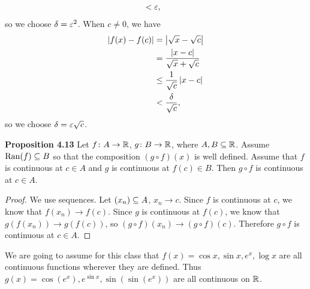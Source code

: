 \documentclass[class=article, crop=false]{standalone}
\begin{document}
\begin{example}{}
\begin{enumerate}[label=\arabic*)]
\begin{align*}
                          &< \varepsilon,
      \end{align*}
      so we choose $\delta = \varepsilon^2$. When $c\neq 0$, we have
      \begin{align*}
        \left\lvert f(x) - f(c) \right\rvert &= \left\lvert \sqrt{x} - \sqrt{c} \right\rvert \\
                          &= \frac{\left\lvert x - c \right\rvert}{\sqrt{x} + \sqrt{c}} \\
                          &\leq \frac{1}{\sqrt{c}}\left\lvert x - c \right\rvert \\
                          &< \frac{\delta}{\sqrt{c}},
      \end{align*}
      so we choose $\delta = \varepsilon\sqrt{c}$.
    \end{enumerate}
  \end{example}
  \newpage
  \textbf{Proposition 4.13} Let $f\colon A\to \mathbb{R}$, $g\colon B\to \mathbb{R}$, where $A, B\subseteq \mathbb{R}$. Assume $\operatorname{Ran}(f)\subseteq B$ so that the composition $(g\circ f)(x)$ is well defined. Assume that $f$ is continuous at $c\in A$ and $g$ is continuous at $f(c)\in B$. Then $g\circ f$ is continuous at $c\in A$.
  \begin{proof}
    We use sequences. Let $(x_n)\subseteq A$, $x_n\to c$. Since $f$ is continuous at $c$, we know that $f(x_n)\to f(c)$. Since $g$ is continuous at $f(c)$, we know that $g(f(x_n))\to g(f(c))$, so $(g\circ f)(x_n)\to (g\circ f)(c)$. Therefore $g\circ f$ is continuous at $c\in A$.
  \end{proof}
  \begin{example}{}
    We are going to assume for this class that $f(x) = \cos x, \sin x, e^x, \log x$ are all continuous functions wherever they are defined. Thus $g(x) = \cos (e^x), e^{\sin x}, \sin(\sin(e^x))$ are all continuous on $\mathbb{R}$.
  \end{example}
\end{document}
